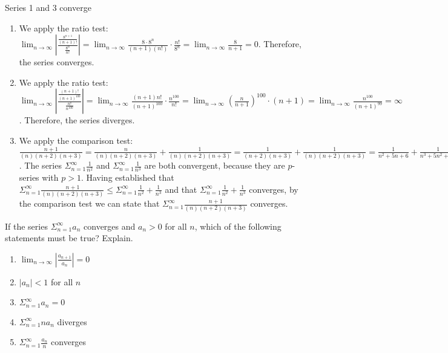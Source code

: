 \begin{Answer}[ref = ratio1]
Series 1 and 3 converge
\begin{enumerate}
\item We apply the ratio test: $\lim_{n \to \infty} \left| \frac{\frac{8^{n + 1}}{(n + 1)!}}{\frac{8^n}{n!}} \right| = \lim_{n \to \infty} \frac{8 \cdot 8^n}{(n + 1)(n!)} \cdot \frac{n!}{8^n} = \lim_{n \to \infty} \frac{8}{n + 1} = 0$. Therefore, the series converges. 
\item We apply the ratio test: $\lim_{n \to \infty} \left| \frac{\frac{(n + 1)!}{(n + 1)^{100}}}{\frac{n!}{n^{100}}} \right| = \lim_{n \to \infty} \frac{(n + 1)n!}{(n + 1)^{100}} \cdot \frac{n^{100}}{n!} = \lim_{n \to \infty} \left( \frac{n}{n + 1} \right)^{100} \cdot (n + 1) = \lim_{n \to \infty} \frac{n^{100}}{(n + 1)^{99}} = \infty$. Therefore, the series diverges. 
\item We apply the comparison test: $\frac{n + 1}{(n)(n + 2)(n + 3)} = \frac{n}{(n)(n + 2)(n + 3)} + \frac{1}{(n)(n + 2)(n + 3)} = \frac{1}{(n + 2)(n + 3)} + \frac{1}{(n)(n + 2)(n + 3)} = \frac{1}{n^2 + 5n + 6} + \frac{1}{n^3 + 5n^2 + 6n} \leq \frac{1}{n^2} + \frac{1}{n^3}$. The series $\Sigma_{n = 1}^\infty \frac{1}{n^2}$ and $\Sigma_{n = 1}^\infty \frac{1}{n^3}$ are both convergent, because they are $p$-series with $p > 1$. Having established that $\Sigma_{n=1}^\infty \frac{n + 1}{(n)(n + 2)(n + 3)} \leq \Sigma_{n=1}^\infty \frac{1}{n^2} + \frac{1}{n^3}$ and that $\Sigma_{n=1}^\infty \frac{1}{n^2} + \frac{1}{n^3}$ converges, by the comparison test we can state that $\Sigma_{n=1}^\infty \frac{n + 1}{(n)(n+2)(n+3)}$ converges. 
\end{enumerate}
\end{Answer}

\begin{Exercise}If the series $\Sigma_{n = 1}^\infty a_n$ converges and $a_n > 0$ for all $n$, which of the following statements must be true? Explain. 
\begin{enumerate}
\item $\lim_{n \to \infty} \left| \frac{a_{n + 1}}{a_n} \right| = 0$
\item $|a_n|<1$ for all $n$
\item $\Sigma_{n=1}^\infty a_n = 0$
\item $\Sigma_{n=1}^\infty na_n$ diverges
\item $\Sigma_{n=1}^\infty \frac{a_n}{n}$ converges
\end{enumerate}
\end{Exercise}

